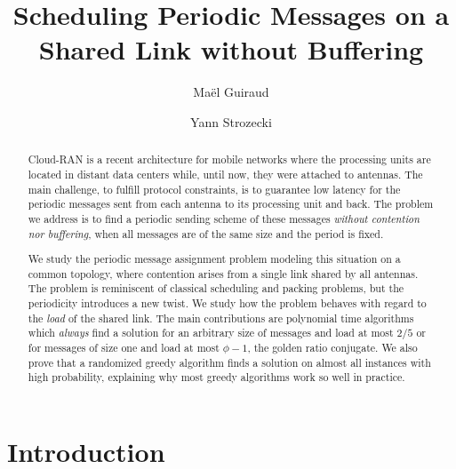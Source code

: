 \documentclass[a4paper,UKenglish,cleveref, autoref, thm-restate]{lipics-v2019}
\title{Scheduling Periodic Messages on a Shared Link without Buffering} %
\author{Ma\"el Guiraud}{LINEACT Laboratory, CESI, Nanterre, France}{mguiraud@cesi.fr}{}{}
\author{Yann Strozecki}{DAVID Laboratory, UVSQ, Versailles, France }{yann.strozecki@uvsq.fr}{}{}%
\begin{document}
\maketitle


\begin{abstract}
Cloud-RAN is a recent architecture for mobile networks where the processing units are located in distant data centers while, until now, they were attached to antennas. The main challenge, to fulfill protocol constraints, is to guarantee low latency for the periodic messages sent from each antenna to its processing unit and back. The problem we address is to find a periodic sending scheme of these messages \emph{without contention nor buffering}, when all messages are of the same size and the period is fixed.

We study the periodic message assignment problem modeling this situation on a common topology, where contention arises from a single link shared by all antennas. The problem is reminiscent of classical scheduling and packing problems, but the periodicity introduces a new twist. We study how the problem behaves with regard to the \emph{load} of the shared link. 
The main contributions are polynomial time algorithms which \emph{always} find a solution for an arbitrary size of messages and load at most $2/5$ or for messages of size one and load at most $\phi - 1$, the golden ratio conjugate. We also prove that a randomized greedy algorithm finds a solution on almost all instances with high probability, explaining why most greedy algorithms work so well in practice.
\end{abstract}


\section{Introduction}
\end{document}

